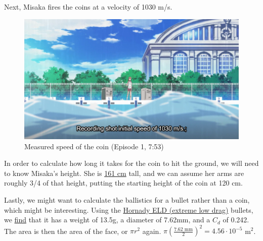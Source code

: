 \documentclass[11pt, oneside]{article}
\begin{document}
Next, Misaka fires the coins at a velocity of 1030 m/s.
\begin{figure}[h!]
  \centering
  \includegraphics[scale=0.2]{speed}
  \caption{Measured speed of the coin (Episode 1, 7:53)}
\end{figure}

In order to calculate how long it takes for the coin to hit the ground,
we will need to know Misaka's height.
She is \href{https://toarumajutsunoindex.fandom.com/wiki/Misaka_Mikoto}
{161 cm} tall, and we can assume her arms are roughly 3/4 of that height,
putting the starting height of the coin at 120 cm.

Lastly, we might want to calculate the ballistics for a bullet rather than 
a coin, which might be interesting. Using the \href{https://www.hornady.com/bullets/eld-match}
{Hornady ELD (extreme low drag)} bullets, 
we \href{https://arxiv.org/pdf/1608.06500.pdf}{find} that
it has a weight of 13.5g, a diameter of 7.62mm, and a \( C_d \) of 0.242.
The area is then the area of the face, or \( \pi r^2 \) again.
\( \pi (\frac{7.62 \text{ mm}}{2})^2 = 4.56 \cdot 10^{-5} \) m\(^2\).
\end{document}
